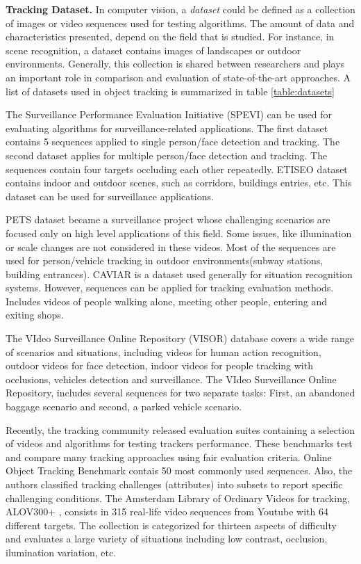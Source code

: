 \textbf{Tracking Dataset. } In computer vision, a \textit{dataset} could be
defined as a collection of
images or video sequences used for testing algorithms. The amount of data and
characteristics presented, depend on the field that is studied.
For instance, in scene recognition, a dataset contains images of landscapes or
outdoor environments. Generally, this collection is shared between researchers
and plays an important role in comparison and evaluation of state-of-the-art
approaches. A list of datasets used in object tracking is summarized in table
\ref{table:datasets}

The Surveillance Performance Evaluation Initiative (SPEVI) \cite{Maggio2005}
can be used for evaluating algorithms for surveillance-related applications. The
first dataset contains 5 sequences applied to single person/face detection and
tracking. The second dataset applies for multiple person/face detection and
tracking. The sequences contain four targets occluding each other repeatedly.
ETISEO dataset \cite{Munder2006} contains indoor and outdoor scenes, such as
corridors, buildings entries, etc. This dataset can be used for surveillance
applications.

PETS dataset \cite{PETS} became a surveillance project whose challenging
scenarios are focused only on high level applications of this field. Some
issues, like illumination or scale changes are not considered in these videos.
Most of the sequences are used for person/vehicle tracking in outdoor
environments(subway stations, building entrances). CAVIAR \cite{Torralba2003}
is a dataset used generally for situation recognition systems. However,
sequences can be applied for tracking evaluation methods. Includes videos of
people walking alone, meeting other people, entering and exiting shops.

The VIdeo Surveillance Online Repository (VISOR) \cite{Vezzani2010} database
covers a wide range of scenarios and situations, including videos for human
action recognition, outdoor videos for face detection, indoor videos for people
tracking with occlusions, vehicles detection and surveillance. The VIdeo
Surveillance Online Repository, includes several sequences for two separate
tasks: First, an abandoned baggage scenario and second, a parked vehicle
scenario.

Recently, the tracking community released evaluation suites containing a
selection of videos and algorithms for testing trackers performance. These
benchmarks test and compare many tracking approaches using fair evaluation
criteria. Online Object Tracking Benchmark \cite{Wu2013B} contais 50 most
commonly used sequences. Also, the authors classified tracking challenges
(attributes) into subsets to report specific challenging conditions. The
Amsterdam Library of Ordinary Videos for tracking, ALOV300+ \cite{Smeulders2014},
consists in 315 real-life video sequences from Youtube with 64 different
targets. The collection is categorized for thirteen aspects of difficulty and
evaluates a large variety of situations including low contrast, occlusion,
ilumination variation, etc.

